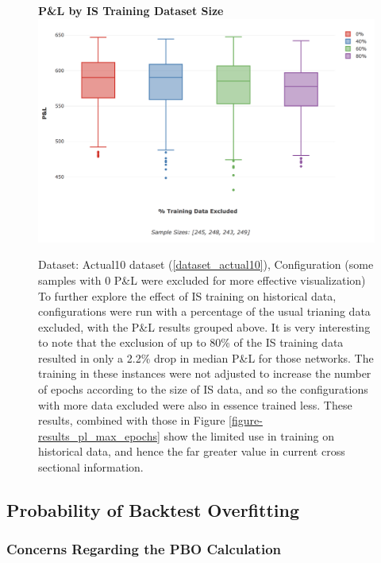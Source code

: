 \documentclass[a4paper,11pt,oneside]{article}
\theoremstyle{plain}
\theoremstyle{definition}
\begin{document}
\begin{figure}[H]
	\centering 
	\textbf{P\&L by IS Training Dataset Size}
	\includegraphics[scale=0.3]{images/results/data/training_data_excluded.png}
	\caption{
		Dataset: Actual10 dataset (\ref{dataset_actual10}), Configuration (some samples with 0 P\&L were excluded for more effective visualization)
		\newline To further explore the effect of IS training on historical data, configurations were run with a percentage of the usual trianing data excluded, with the P\&L results grouped above. It is very interesting to note that the exclusion of up to 80\% of the IS training data resulted in only a 2.2\% drop in median P\&L for those networks. The training in these instances were not adjusted to increase the number of epochs according to the size of IS data, and so the configurations with more data excluded were also in essence trained less. These results, combined with those in Figure \ref{figure-results_pl_max_epochs} show the limited use in training on historical data, and hence the far greater value in current cross sectional information.}
	\label{figure-results_it3_validationset}
\end{figure}


\newpage

\subsection{Probability of Backtest Overfitting}

\subsubsection{Concerns Regarding the PBO Calculation}\label{results_pboconcerns}
\end{document}
